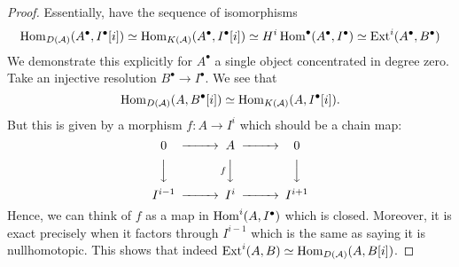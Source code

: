 \begin{proof}
    Essentially, have the sequence of isomorphisms $$\operatorname{Hom}_{D(\mathcal{A})}(A^\bullet, I^\bullet[i])\simeq \operatorname{Hom}_{K(\mathcal{A})}(A^\bullet, I^\bullet[i])\simeq H^i \operatorname{Hom}^\bullet(A^\bullet, I^\bullet)\simeq \operatorname{Ext}^i(A^\bullet, B^\bullet)$$
    We demonstrate this explicitly for $A^\bullet$ a single object concentrated in degree zero. Take an injective resolution $B^\bullet \to I^\bullet$. We see that
\begin{equation*}
    \operatorname{Hom}_{D(\mathcal{A})}(A,B^\bullet[i]) \simeq \operatorname{Hom}_{K(\mathcal{A})}(A,I^\bullet[i]).
\end{equation*}
But this is given by a morphism $f:A\to I^i$ which should be a chain map:
\begin{equation*}
    \begin{CD}
        0 @>>> A @>>> 0 \\
          @VVV @VfVV @VVV \\
        I^{i-1} @>>> I^i @>>> I^{i+1}
    \end{CD}
\end{equation*}
Hence, we can think of $f$ as a map in $\operatorname{Hom}^i(A, I^\bullet)$ which is closed. Moreover, it is exact precisely when it factors through $I^{i-1}$ which is the same as saying it is nullhomotopic. This shows that indeed $\operatorname{Ext}^i(A,B)\simeq\operatorname{Hom}_{D(\mathcal{A})}(A,B[i])$.
\end{proof}


%




